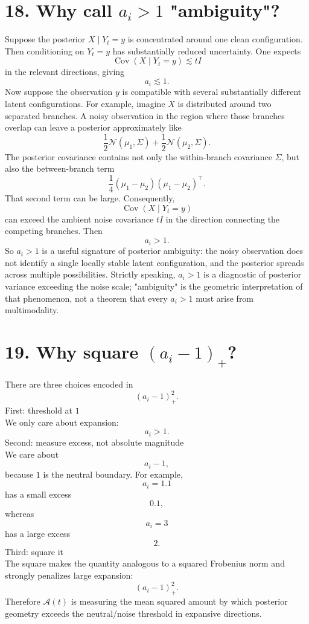 \documentclass{article}
\begin{document}
\section*{18. Why call $a_i>1$ "ambiguity"?}
Suppose the posterior $X\mid Y_t=y$ is concentrated around one clean configuration. Then conditioning on $Y_t=y$ has substantially reduced uncertainty.
One expects
\[
\operatorname{Cov}(X\mid Y_t=y) \lesssim tI
\]
in the relevant directions, giving
\[
a_i \lesssim 1.
\]
Now suppose the observation $y$ is compatible with several substantially different latent configurations.
For example, imagine $X$ is distributed around two separated branches. A noisy observation in the region where those branches overlap can leave a posterior approximately like
\[
\frac12\mathcal N(\mu_1,\Sigma) + \frac12\mathcal N(\mu_2,\Sigma).
\]
The posterior covariance contains not only the within-branch covariance $\Sigma$, but also the between-branch term
\[
\frac14(\mu_1-\mu_2)(\mu_1-\mu_2)^\top.
\]
That second term can be large.
Consequently,
\[
\operatorname{Cov}(X\mid Y_t=y)
\]
can exceed the ambient noise covariance $tI$ in the direction connecting the competing branches.
Then
\[
a_i > 1.
\]
So $a_i > 1$ is a useful signature of posterior ambiguity: the noisy observation does not identify a single locally stable latent configuration, and the posterior spreads across multiple possibilities.
Strictly speaking, $a_i > 1$ is a diagnostic of posterior variance exceeding the noise scale; "ambiguity" is the geometric interpretation of that phenomenon, not a theorem that every $a_i>1$ must arise from multimodality.

\section*{19. Why square $(a_i-1)_+$?}
There are three choices encoded in
\[
(a_i-1)_+^2.
\]
First: threshold at $1$ \\
We only care about expansion:
\[
a_i > 1.
\]
Second: measure excess, not absolute magnitude \\
We care about
\[
a_i-1,
\]
because $1$ is the neutral boundary.
For example,
\[
a_i = 1.1
\]
has a small excess
\[
0.1,
\]
whereas
\[
a_i = 3
\]
has a large excess
\[
2.
\]
Third: square it \\
The square makes the quantity analogous to a squared Frobenius norm and strongly penalizes large expansion:
\[
(a_i-1)_+^2.
\]
Therefore $\mathcal A(t)$ is measuring the mean squared amount by which posterior geometry exceeds the neutral/noise threshold in expansive directions.
\end{document}
